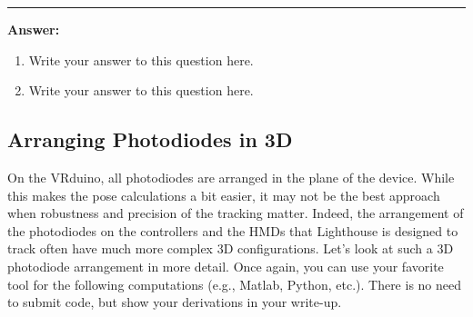 \documentclass[conference]{styles/acmsiggraph}
\newenvironment{answer}{}{}
\newcommand{\points}[1]{\hfill \normalfont{(\textit{#1pts})}}
\begin{document}

\begin{answer}
\rule{\textwidth}{0.4pt}
\textbf{Answer:}

\begin{enumerate}[label=(\roman*)]
\item Write your answer to this question here.

\item Write your answer to this question here.
\end{enumerate}
\end{answer}



\newpage
\subsection{Arranging Photodiodes in 3D \points{20}}

On the VRduino, all photodiodes are arranged in the plane of the device. While this makes the pose calculations a bit easier, it may not be the best approach when robustness and precision of the tracking matter. Indeed, the arrangement of the photodiodes on the controllers and the HMDs that Lighthouse is designed to track often have much more complex 3D configurations. Let's look at such a 3D photodiode arrangement in more detail. Once again, you can use your favorite tool for the following computations (e.g., Matlab, Python, etc.). There is no need to submit code, but show your derivations in your write-up.
\end{document}
